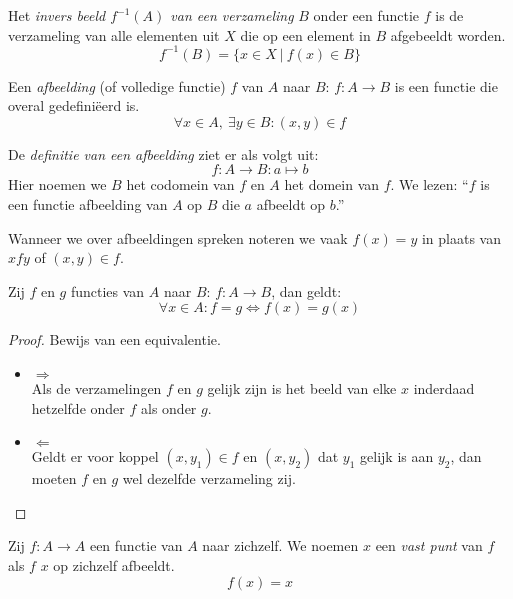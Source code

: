 \documentclass[main.tex]{subfiles}
\begin{document}
\begin{de}
  Het \emph{invers beeld $f^{-1}(A)$ van een verzameling} $B$ onder een functie $f$ is de verzameling van alle elementen uit $X$ die op een element in $B$ afgebeeldt worden.
  \[ f^{-1}(B) = \{ x \in X \ |\ f(x) \in B \} \]
\end{de}

\begin{de}
  Een \emph{afbeelding} (of volledige functie) $f$ van $A$ naar $B$: $f: A \rightarrow B$ is een functie die overal gedefini\"eerd is.
  \[ \forall x \in A,\ \exists y \in B: (x,y) \in f \]
\end{de} 
 
\begin{de}
  De \emph{definitie van een afbeelding} ziet er als volgt uit:
  \[ f: A \rightarrow B: a \mapsto b \]
  Hier noemen we $B$ het codomein van $f$ en $A$ het domein van $f$.
  We lezen: ``$f$ is een functie afbeelding van $A$ op $B$ die $a$ afbeeldt op $b$.''
\end{de} 
 
\begin{de}
  Wanneer we over afbeeldingen spreken noteren we vaak $f(x) = y$ in plaats van $x f y$ of $(x,y) \in f$.
\end{de}


\begin{st}
  Zij $f$ en $g$ functies van $A$ naar $B$: $f: A \rightarrow B$, dan geldt:
  \[ \forall x \in A: f = g \Leftrightarrow f(x) = g(x) \]  
  \begin{proof}
    Bewijs van een equivalentie.
    \begin{itemize}
    \item $\Rightarrow$\\
      Als de verzamelingen $f$ en $g$ gelijk zijn is het beeld van elke $x$ inderdaad hetzelfde onder $f$ als onder $g$.
    \item $\Leftarrow$\\
      Geldt er voor koppel $(x,y_{1}) \in f$ en $(x,y_{2})$ dat $y_{1}$ gelijk is aan $y_{2}$, dan moeten $f$ en $g$ wel dezelfde verzameling zij.
    \end{itemize}
  \end{proof}
\end{st}

\begin{de}
  Zij $f: A \rightarrow A$ een functie van $A$ naar zichzelf.
  We noemen $x$ een \emph{vast punt} van $f$ als $f$ $x$ op zichzelf afbeeldt.
  \[ f(x) = x \]
\end{de}
\end{document}
